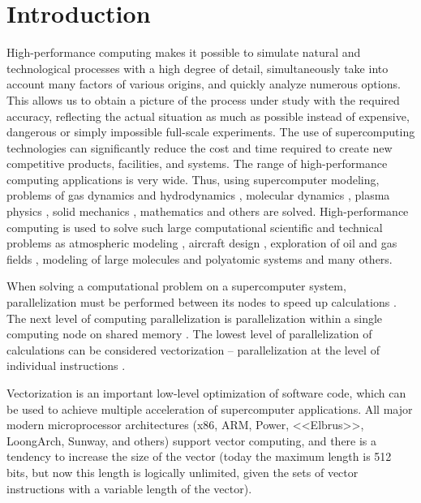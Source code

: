 \documentclass[
11pt,%
tightenlines,%
twoside,%
onecolumn,%
nofloats,%
nobibnotes,%
nofootinbib,%
superscriptaddress,%
noshowpacs,%
centertags]%
{revtex4}
\begin{document}


\maketitle


\section{Introduction}

High-performance computing makes it possible to simulate natural and technological processes with a high degree of detail, simultaneously take into account many factors of various origins, and quickly analyze numerous options.
This allows us to obtain a picture of the process under study with the required accuracy, reflecting the actual situation as much as possible instead of expensive, dangerous or simply impossible full-scale experiments.
The use of supercomputing technologies can significantly reduce the cost and time required to create new competitive products, facilities, and systems.
The range of high-performance computing applications is very wide.
Thus, using supercomputer modeling, problems of gas dynamics and hydrodynamics \cite{01Smirnov}, molecular dynamics \cite{02Guo}, plasma physics \cite{03Asch}, solid mechanics \cite{04Morgan}, mathematics \cite{05Lohiya} and others are solved.
High-performance computing is used to solve such large computational scientific and technical problems as atmospheric modeling \cite{06Kang}, aircraft design \cite{07Morad}, exploration of oil and gas fields \cite{08Eremin}, modeling of large molecules and polyatomic systems \cite{09Yan} and many others.

When solving a computational problem on a supercomputer system, parallelization must be performed between its nodes to speed up calculations \cite{10Voevodin}.
The next level of computing parallelization is parallelization within a single computing node on shared memory \cite{11Zhou}.
The lowest level of parallelization of calculations can be considered vectorization -- parallelization at the level of individual instructions \cite{12Feng}.

Vectorization is an important low-level optimization of software code, which can be used to achieve multiple acceleration of supercomputer applications.
All major modern microprocessor architectures (x86, ARM, Power, <<Elbrus>>, LoongArch, Sunway, and others) support vector computing, and there is a tendency to increase the size of the vector (today the maximum length is 512 bits, but now this length is logically unlimited, given the sets of vector instructions with a variable length of the vector).
\end{document}
